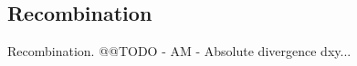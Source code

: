 \documentclass[a4paper,11pt,abstracton,hidelinks]{scrartcl}
\begin{document}
\subsection*{Recombination}

%
Recombination. @@TODO - AM - Absolute divergence dxy...


\printbibliography
\end{document}
